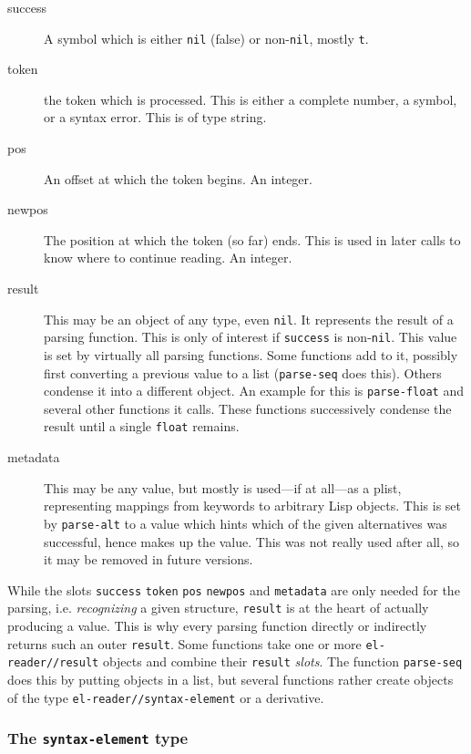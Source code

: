 \documentclass[a4paper,10pt,twoside]{report}
\newcommand{\sym}[1]{\texttt{#1}}
\newcommand{\fun}[1]{\texttt{#1}}
\newcommand{\nil}{\sym{nil}}
\newcommand{\tee}{\sym{t}}
\begin{document}
\begin{description}
\item[success] A symbol which is either \nil{} (false) or non-\nil{}, mostly
  \tee{}.
\item[token] the token which is processed.  This is either a complete number, a
  symbol, or a syntax error.  This is of type string.
\item[pos] An offset at which the token begins.  An integer.
\item[newpos] The position at which the token (so far) ends.  This is used in
  later calls to know where to continue reading.  An integer.
\item[result] This may be an object of any type, even \nil{}.  It represents the
  result of a parsing function.  This is only of interest if \sym{success} is
  non-\nil{}.  This value is set by virtually all parsing functions.  Some
  functions add to it, possibly first converting a previous value to a list
  (\fun{parse-seq} does this).  Others condense it into a different object.  An
  example for this is \fun{parse-float} and several other functions it calls.
  These functions successively condense the result until a single \sym{float}
  remains.
\item[metadata] This may be any value, but mostly is used---if at all---as a
  plist, representing mappings from keywords to arbitrary Lisp objects.  This is
  set by \fun{parse-alt} to a value which hints which of the given alternatives
  was successful, hence makes up the value.  This was not really used after
  all, so it may be removed in future versions.
\end{description}

While the slots \sym{success} \sym{token} \sym{pos} \sym{newpos} and
\sym{metadata} are only needed for the parsing, i.e. \emph{recognizing} a given
structure, \sym{result} is at the heart of actually producing a value.  This is
why every parsing function directly or indirectly returns such an outer
\sym{result}.  Some functions take one or more \sym{el-reader//result} objects
and combine their \sym{result} \emph{slots}.  The function \fun{parse-seq} does
this by putting objects in a list, but several functions rather create objects
of the type \sym{el-reader//syntax-element} or a derivative.

\subsubsection{The \sym{syntax-element} type}
\label{subsubsec:syntax-element}
\end{document}
